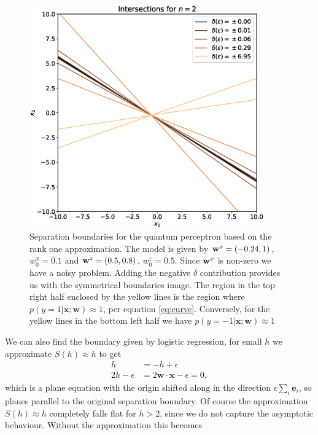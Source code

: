 \begin{figure}[htb!]
    \centering
    \includegraphics[width = 0.9\textwidth]{figures/chapter3/intersections_qm_exact_mirror.eps}
    \caption{Separation boundaries for the quantum perceptron based on the rank one approximation. The model is given by $\mathbf{w}^{x} = (-0.24, 1)$, $w^x_0 = 0.1$ and  $\mathbf{w}^{z} = (0.5, 0.8)$, $w^z_0 = 0.5$. Since $\mathbf{w}^{x}$ is non-zero we have a noisy problem. Adding the negative $\delta$ contribution provides us with the symmetrical boundaries image. The region in the top right half enclosed by the yellow lines is the region where $p(y=1|\mathbf{x};\mathbf{w})\approx 1$, per equation \ref{eq:curve}. Conversely, for the yellow lines in the bottom left half we have $p(y=-1|\mathbf{x};\mathbf{w})\approx 1$ }
    \label{fig:int_qm_exact_mirror}
\end{figure}
We can also find the boundary given by logistic regression, for small $h$ we approximate $S(h) \approx h$ to get
\begin{align*}
    h &= - h + \epsilon\\
    2h - \epsilon &=  2 \mathbf{w}\cdot\mathbf{x} - \epsilon = 0,
\end{align*}
which is a plane equation with the origin shifted along in the direction $\epsilon \sum_i \mathbf{e}_i$, so planes parallel to the original separation boundary. Of course the approximation $S(h) \approx h$ completely falls flat for $h>2$, since we do not capture the asymptotic behaviour. Without the approximation this becomes
